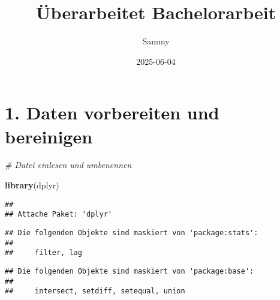 \documentclass[
]{article}
\title{Überarbeitet Bachelorarbeit}
\author{Sammy}
\date{2025-06-04}
\newenvironment{Shaded}{\begin{snugshade}}{\end{snugshade}}
\newcommand{\CommentTok}[1]{\textcolor[rgb]{0.56,0.35,0.01}{\textit{#1}}}
\newcommand{\FunctionTok}[1]{\textcolor[rgb]{0.13,0.29,0.53}{\textbf{#1}}}
\newcommand{\NormalTok}[1]{#1}
\begin{document}
\maketitle

\section{1. Daten vorbereiten und
bereinigen}\label{daten-vorbereiten-und-bereinigen}

\begin{Shaded}
\begin{Highlighting}[]
\CommentTok{\# Datei einlesen und umbenennen }

\FunctionTok{library}\NormalTok{(dplyr) }
\end{Highlighting}
\end{Shaded}

\begin{verbatim}
## 
## Attache Paket: 'dplyr'
\end{verbatim}

\begin{verbatim}
## Die folgenden Objekte sind maskiert von 'package:stats':
## 
##     filter, lag
\end{verbatim}

\begin{verbatim}
## Die folgenden Objekte sind maskiert von 'package:base':
## 
##     intersect, setdiff, setequal, union
\end{verbatim}
\end{document}

